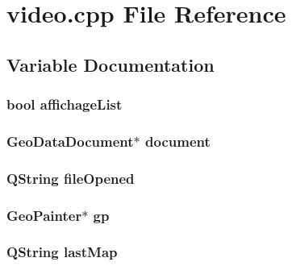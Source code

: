 \hypertarget{a00042}{\section{video.\-cpp File Reference}
\label{a00042}
}


\subsection{Variable Documentation}
\hypertarget{a00042_aef1d7c2fea653fb1d729b2f40b2c2c53}{
\subsubsection[{affichage\-List}]{\setlength{\rightskip}{0pt plus 5cm}bool affichage\-List}}\label{a00042_aef1d7c2fea653fb1d729b2f40b2c2c53}
\hypertarget{a00042_a8b0f68f97ddd8c30ad31efa6919778ee}{
\subsubsection[{document}]{\setlength{\rightskip}{0pt plus 5cm}Geo\-Data\-Document$\ast$ document}}\label{a00042_a8b0f68f97ddd8c30ad31efa6919778ee}
\hypertarget{a00042_ae55f476d1700ade204b3038b8c37f8ba}{
\subsubsection[{file\-Opened}]{\setlength{\rightskip}{0pt plus 5cm}Q\-String file\-Opened}}\label{a00042_ae55f476d1700ade204b3038b8c37f8ba}
\hypertarget{a00042_a6db9a27632d51962600fe2f1debbb678}{
\subsubsection[{gp}]{\setlength{\rightskip}{0pt plus 5cm}Geo\-Painter$\ast$ gp}}\label{a00042_a6db9a27632d51962600fe2f1debbb678}
\hypertarget{a00042_ade9b9dbbdedb4e80abbaa2201ba82d05}{
\subsubsection[{last\-Map}]{\setlength{\rightskip}{0pt plus 5cm}Q\-String last\-Map}}\label{a00042_ade9b9dbbdedb4e80abbaa2201ba82d05}
